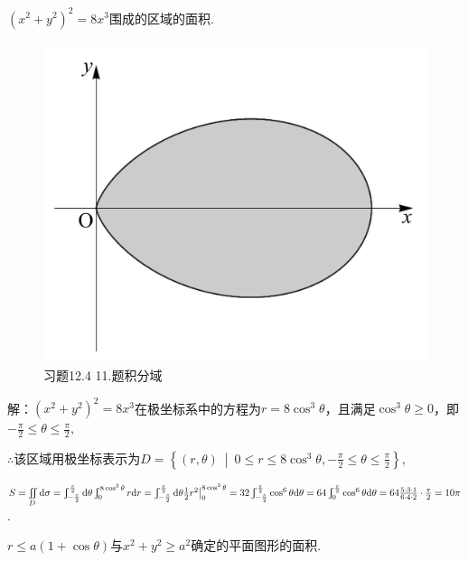 \documentclass[12pt,UTF8]{ctexart}
\newcommand\Set[2]{\left\{#1\ \middle\vert\ #2 \right\}}
\newcommand{\Int}[4]{\varint\nolimits_{#1}^{#2}#3\mathrm d#4}
\newcommand{\IInt}[3]{\iint\limits_{#1}#2\mathrm d#3}
\begin{document}
\begin{enumerate}
$(x^2+y^2)^2=8x^3$围成的区域的面积.

\begin{figure}[H]
\begin{center}
\includegraphics[height=0.4\textheight]{Figures19/Fig12-4-11.pdf}
\end{center}
\caption{习题12.4 11.题积分域}
\label{12-4-11}
\end{figure}

解：$(x^2+y^2)^2=8x^3$在极坐标系中的方程为$r=8\cos^3\theta$，且满足$\cos^3\theta\geqslant0$，即$-\frac\pi2\leqslant\theta\leqslant\frac\pi2$,

$\therefore$该区域用极坐标表示为$D=\Set{(r,\theta)}{0\leqslant r\leqslant8\cos^3\theta,-\frac\pi2\leqslant\theta\leqslant\frac\pi2}$,

$S=\IInt D{}\sigma=\Int{-\frac\pi2}{\frac\pi2}{}\theta\Int0{8\cos^3\theta}rr=\Int{-\frac\pi2}{\frac\pi2}{}\theta\frac12r^2\big|_0^{8\cos^3\theta}=32\Int{-\frac\pi2}{\frac\pi2}{\cos^6\theta}\theta=64\Int0{\frac\pi2}{\cos^6\theta}\theta\\
=64\frac{5\cdot3\cdot1}{6\cdot4\cdot2}\cdot\frac\pi2=10\pi$.

$r\leqslant a(1+\cos\theta)$与$x^2+y^2\geqslant a^2$确定的平面图形的面积.


\end{enumerate}
\end{document}
